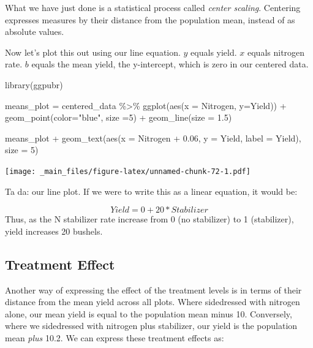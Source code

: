 \documentclass[
]{book}
\newenvironment{Shaded}{\begin{snugshade}}{\end{snugshade}}
\newcommand{\AttributeTok}[1]{\textcolor[rgb]{0.77,0.63,0.00}{#1}}
\newcommand{\DecValTok}[1]{\textcolor[rgb]{0.00,0.00,0.81}{#1}}
\newcommand{\FloatTok}[1]{\textcolor[rgb]{0.00,0.00,0.81}{#1}}
\newcommand{\FunctionTok}[1]{\textcolor[rgb]{0.00,0.00,0.00}{#1}}
\newcommand{\NormalTok}[1]{#1}
\newcommand{\OtherTok}[1]{\textcolor[rgb]{0.56,0.35,0.01}{#1}}
\newcommand{\SpecialCharTok}[1]{\textcolor[rgb]{0.00,0.00,0.00}{#1}}
\newcommand{\StringTok}[1]{\textcolor[rgb]{0.31,0.60,0.02}{#1}}
\begin{document}
What we have just done is a statistical process called \emph{center scaling}. Centering expresses measures by their distance from the population mean, instead of as absolute values.

Now let's plot this out using our line equation. \(y\) equals yield. \(x\) equals nitrogen rate. \(b\) equals the mean yield, the y-intercept, which is zero in our centered data.

\begin{Shaded}
\begin{Highlighting}[]
\FunctionTok{library}\NormalTok{(ggpubr)}

\NormalTok{means\_plot }\OtherTok{=}\NormalTok{ centered\_data }\SpecialCharTok{\%\textgreater{}\%}
  \FunctionTok{ggplot}\NormalTok{(}\FunctionTok{aes}\NormalTok{(}\AttributeTok{x =}\NormalTok{ Nitrogen, }\AttributeTok{y=}\NormalTok{Yield)) }\SpecialCharTok{+}
  \FunctionTok{geom\_point}\NormalTok{(}\AttributeTok{color=}\StringTok{"blue"}\NormalTok{, }\AttributeTok{size =}\DecValTok{5}\NormalTok{) }\SpecialCharTok{+} 
  \FunctionTok{geom\_line}\NormalTok{(}\AttributeTok{size =} \FloatTok{1.5}\NormalTok{) }

\NormalTok{means\_plot }\SpecialCharTok{+} 
  \FunctionTok{geom\_text}\NormalTok{(}\FunctionTok{aes}\NormalTok{(}\AttributeTok{x =}\NormalTok{ Nitrogen }\SpecialCharTok{+} \FloatTok{0.06}\NormalTok{, }\AttributeTok{y =}\NormalTok{ Yield, }\AttributeTok{label =}\NormalTok{ Yield), }\AttributeTok{size =} \DecValTok{5}\NormalTok{)}
\end{Highlighting}
\end{Shaded}

\texttt{[image: \_main\_files/figure-latex/unnamed-chunk-72-1.pdf]}

Ta da: our line plot. If we were to write this as a linear equation, it would be:

\[ Yield = 0 + 20*Stabilizer\]
Thus, as the N stabilizer rate increase from 0 (no stabilizer) to 1 (stabilizer), yield increases 20 bushels.

\hypertarget{treatment-effect}{%
\subsection{Treatment Effect}\label{treatment-effect}}

Another way of expressing the effect of the treatment levels is in terms of their distance from the mean yield across all plots. Where sidedressed with nitrogen alone, our mean yield is equal to the population mean minus 10. Conversely, where we sidedressed with nitrogen plus stabilizer, our yield is the population mean \emph{plus} 10.2. We can express these treatment effects as:
\end{document}
